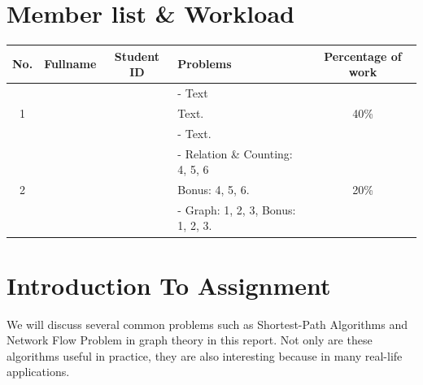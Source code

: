 \documentclass[a4paper]{article}
\begin{document}

\newpage
\tableofcontents
\newpage


\section{Member list \& Workload}

\begin{center}
	\begin{tabular}{|c|c|c|l|c|}
		\hline
		\textbf{No.}       & \textbf{Fullname}                    & \textbf{Student ID}      & \textbf{Problems}                 & \textbf{Percentage of work} \\
		\hline
		\multirow{3}{*}{1} & \multirow{3}{*}{} & \multirow{3}{*}{} & - Text                            & \multirow{3}{*}{40\%}       \\
		                   &                                      &                          & Text.                             &                             \\
		                   &                                      &                          & - Text.                           &                             \\
		\hline
		\multirow{3}{*}{2} & \multirow{3}{*}{}        & \multirow{3}{*}{} & - Relation \& Counting: 4, 5, 6   & \multirow{3}{*}{20\%}       \\
		                   &                                      &                          & Bonus: 4, 5, 6.                   &                             \\
		                   &                                      &                          & - Graph: 1, 2, 3, Bonus: 1, 2, 3. &                             \\
		\hline
	\end{tabular}
\end{center}
\newpage
\section{Introduction To Assignment}
\par
We will discuss several common problems such as Shortest-Path Algorithms and Network Flow Problem in graph theory in this report. Not only are these
algorithms useful in practice, they are also interesting because in many real-life applications.
\par
\end{document}
